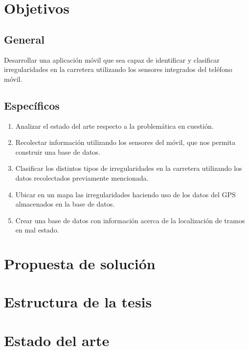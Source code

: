 \section*{Objetivos}
\subsection*{General}

Desarrollar una aplicación móvil que sea capaz de identificar y clasificar irregularidades en la carretera utilizando los sensores integrados del teléfono móvil.

\subsection*{Específicos}
\begin{enumerate}
		\item Analizar el estado del arte respecto a la problemática en cuestión.
		\item Recolectar información utilizando los sensores del móvil, que nos permita construir una base de datos.
		\item Clasificar los distintos tipos de irregularidades en la carretera utilizando los datos recolectados previamente mencionada. 
		\item Ubicar en un mapa las irregularidades haciendo uso de los datos del GPS almacenados en la base de datos.
		\item Crear una base de datos con información acerca de la localización de tramos en mal estado. 

\end{enumerate}

\section*{Propuesta de solución}

\section*{Estructura de la tesis}

\section*{Estado del arte}

